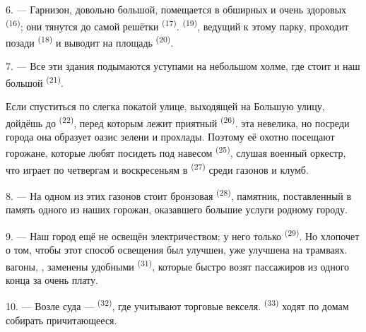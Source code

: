 \VUsaut{5.0mm}
\VUsaut{3.4mm}

6. --- Гарнизон, довольно большой, помещается в обширных и очень здоровых
 \textsuperscript{(16)}; они тянутся до самой решётки
 \textsuperscript{(17)}.  \textsuperscript{(19)},
ведущий к этому парку, проходит позади 
\textsuperscript{(18)} и выводит на площадь  \textsuperscript{(20)}.

7. --- Все эти здания подымаются уступами на небольшом холме, где стоит и
наш большой  \textsuperscript{(21)}.

Если спуститься по слегка покатой улице, выходящей на Большую улицу,
дойдёшь до  \textsuperscript{(22)}, перед которым лежит приятный
 \textsuperscript{(26)}.  эта невелика, но посреди
города она образует оазис зелени и прохлады. Поэтому её охотно посещают
горожане, которые любят посидеть под навесом  \textsuperscript{(25)},
слушая военный оркестр, что играет по четвергам и воскресеньям в
 \textsuperscript{(27)} среди газонов и клумб.

8. --- На одном из этих газонов стоит бронзовая 
\textsuperscript{(28)}, памятник, поставленный в память одного из наших горожан,
оказавшего большие услуги родному городу.

\VUsaut{4.0mm}
\VUsaut{3.4mm}

9. --- Наш город ещё не освещён электричеством; у него только
 \textsuperscript{(29)}. Но  хлопочет
о том, чтобы этот способ освещения был улучшен,  уже
улучшена  на трамваях.  вагоны,  , заменены удобными 
\textsuperscript{(31)}, которые быстро возят пассажиров из одного конца
 за очень  плату.

10. --- Возле суда ---  \textsuperscript{(32)}, где учитывают торговые
векселя.  \textsuperscript{(33)} ходят по домам
собирать причитающееся.

\VUsaut{4.0mm}
\VUsaut{3.4mm}

